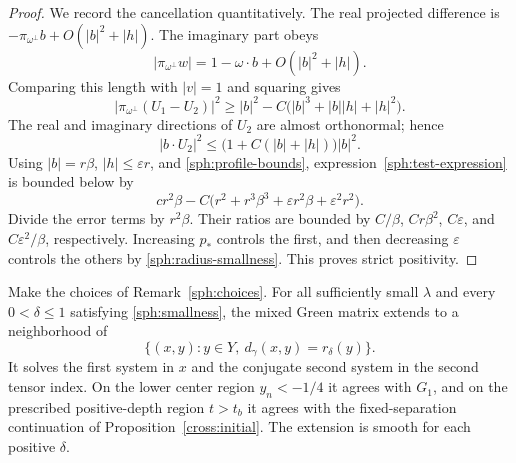 \begin{proof}
We record the cancellation quantitatively.  The real projected
difference is
$-\pi_{\omega^\perp}b+O(|b|^2+|h|)$.  The imaginary part obeys
\[
 |\pi_{\omega^\perp}w|
    =1-\omega\cdot b+O(|b|^2+|h|).
\]
Comparing this length with $|v|=1$ and squaring gives
\[
 |\pi_{\omega^\perp}(U_1-U_2)|^2
 \ge |b|^2-C\bigl(|b|^3+|b||h|+|h|^2\bigr).
\]
The real and imaginary directions of $U_2$ are almost orthonormal;
hence
\[
 |b\cdot U_2|^2\le
       \bigl(1+C(|b|+|h|)\bigr)|b|^2.
\]
Using $|b|=r\beta$, $|h|\le\varepsilon r$, and
\eqref{sph:profile-bounds}, expression~\eqref{sph:test-expression}
is bounded below by
\begin{equation}\label{sph:test-lower-bound}
 c r^2\beta-
 C\bigl(r^2+r^3\beta^3+\varepsilon r^2\beta+
                  \varepsilon^2r^2\bigr).
\end{equation}
Divide the error terms by $r^2\beta$.  Their ratios are bounded by
$C/\beta$, $Cr\beta^2$, $C\varepsilon$, and
$C\varepsilon^2/\beta$, respectively.  Increasing $p_*$ controls the
first, and then decreasing $\varepsilon$ controls the others by
\eqref{sph:radius-smallness}.  This proves strict positivity.
\end{proof}

\begin{proposition}
\label{sph:continuation}
Make the choices of Remark~\ref{sph:choices}.  For all sufficiently
small $\lambda$ and every $0<\delta\le1$ satisfying
\eqref{sph:smallness}, the mixed Green matrix extends to a neighborhood
of
\[
 \{(x,y):y\in Y,\ d_\gamma(x,y)=r_\delta(y)\}.
\]
It solves the first system in $x$ and the conjugate second system in
the second tensor index.  On the lower center region $y_n<-1/4$ it
agrees with $G_1$, and on the prescribed positive-depth region
$t>t_b$ it agrees with the fixed-separation continuation of
Proposition~\ref{cross:initial}.  The extension is smooth for each
positive $\delta$.
\end{proposition}


